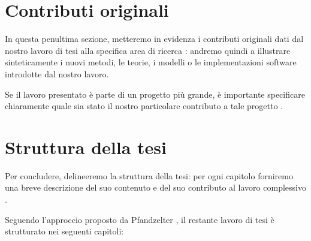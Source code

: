 \section{Contributi originali}

In questa penultima sezione, metteremo in evidenza i contributi originali dati dal nostro lavoro di tesi alla specifica area di ricerca \cite{pfandzelter2022thesis}: andremo quindi a illustrare sinteticamente i nuovi metodi, le teorie, i modelli o le implementazioni software introdotte dal nostro lavoro.

\medskip

Se il lavoro presentato è parte di un progetto più grande, è importante specificare chiaramente quale sia stato il nostro particolare contributo a tale progetto \cite{tuni2019guide}.

\section{Struttura della tesi}

Per concludere, delineeremo la struttura della tesi: per ogni capitolo forniremo una breve descrizione del suo contenuto e del suo contributo al lavoro complessivo \cite{tuni2019guide}.

\medskip

Seguendo l'approccio proposto da Pfandzelter \etAl \cite{pfandzelter2022thesis}, il restante lavoro di tesi è strutturato nei seguenti capitoli:

